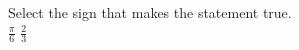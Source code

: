 \documentclass{ximera}
\author{David Kish}
\begin{document}
\begin{exercise}
Select the sign that makes the statement true.\\
$\frac{\pi}{6}$ \wordChoice{\choice[correct]{$<$}\choice{$>$}\choice{$=$}} $\frac{2}{3}$ 

\end{exercise}
\end{document}
